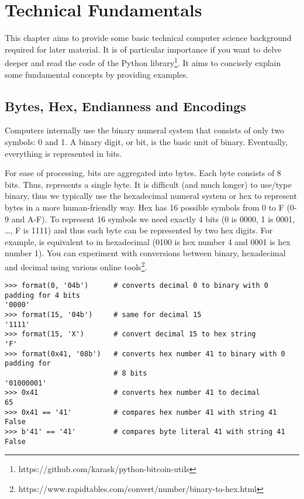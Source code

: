 \chapter{Technical Fundamentals}
\label{ch:technical-fundamentals}

\begin{summary}
This chapter aims to provide some basic technical computer science background required for later material. It is of particular importance if you want to delve deeper and read the code of the Python  library\footnote{https://github.com/karask/python-bitcoin-utils}. It aims to concisely explain some fundamental concepts by providing examples. 
\end{summary}

\section{Bytes, Hex, Endianness and Encodings}
Computers internally use the binary numeral system that consists of only two symbols: 0 and 1. A binary digit, or bit, is the basic unit of binary. Eventually, everything is represented in bits.

For ease of processing, bits are aggregated into bytes. Each byte consists of 8 bits. Thus,  represents a single byte. It is difficult (and much longer) to use/type binary, thus we typically use the hexadecimal numeral system or hex to represent bytes in a more human-friendly way. Hex has 16 possible symbols from 0 to F (0-9 and A-F). To represent 16 symbols we need exactly 4 bits (0 is 0000, 1 is 0001, …, F is 1111) and thus each byte can be represented by two hex digits. For example,  is equivalent to  in hexadecimal (0100 is hex number 4 and 0001 is hex number 1). You can experiment with conversions between binary, hexadecimal and decimal using various online tools\footnote{https://www.rapidtables.com/convert/number/binary-to-hex.html}.

\vspace{1em}
\begin{lstlisting}[style=Python,label={lst:encodings-1},caption={Python examples},captionpos=b]
>>> format(0, '04b')      # converts decimal 0 to binary with 0 padding for 4 bits
'0000'
>>> format(15, '04b')     # same for decimal 15
'1111'
>>> format(15, 'X')       # convert decimal 15 to hex string
'F'
>>> format(0x41, '08b')   # converts hex number 41 to binary with 0 padding for
                          # 8 bits
'01000001'
>>> 0x41                  # converts hex number 41 to decimal
65
>>> 0x41 == '41'          # compares hex number 41 with string 41
False
>>> b'41' == '41'         # compares byte literal 41 with string 41
False
\end{lstlisting}
\vspace{1em}

